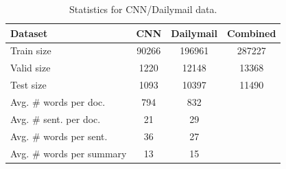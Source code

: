 \documentclass[12pt]{report}
\begin{document}
\begin{table}[h]
\centering
\begin{tabular}{lccc}
\toprule
Dataset  & CNN & Dailymail & Combined\\
\midrule
Train size & 90266 & 196961 & 287227\\
Valid size & 1220 & 12148 & 13368\\
Test size & 1093 & 10397 & 11490 \\
Avg. \# words per doc. & 794 & 832\\
Avg. \# sent. per doc. & 21 & 29\\
Avg. \# words per sent. & 36 & 27\\
Avg. \# words per summary & 13 & 15 \\
\bottomrule
\end{tabular}
\caption{Statistics for CNN/Dailymail data.}
\label{table:data_stats}
\end{table}
\end{document}
